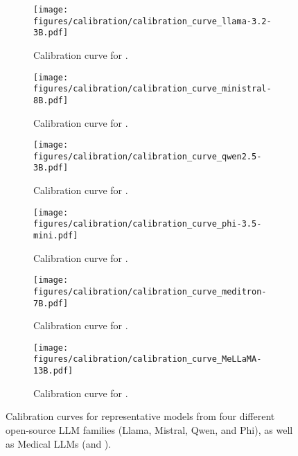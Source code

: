 \begin{figure}[h]
    \centering
    \begin{subfigure}{0.233\textwidth}
        \centering
        \texttt{[image: figures/calibration/calibration\_curve\_llama-3.2-3B.pdf]}
        \caption{Calibration curve for \llamad.}
    \end{subfigure}
    \hfill
    \begin{subfigure}{0.233\textwidth}
        \centering
        \texttt{[image: figures/calibration/calibration\_curve\_ministral-8B.pdf]}
        \caption{Calibration curve for \ministral.}
    \end{subfigure}
    
    \vspace{0.5cm}
    
    \begin{subfigure}{0.233\textwidth}
        \centering
        \texttt{[image: figures/calibration/calibration\_curve\_qwen2.5-3B.pdf]}
        \caption{Calibration curve for \qwenc.}
    \end{subfigure}
    \hfill
    \begin{subfigure}{0.233\textwidth}
        \centering
        \texttt{[image: figures/calibration/calibration\_curve\_phi-3.5-mini.pdf]}
        \caption{Calibration curve for \phic.}
    \end{subfigure}
    
    \vspace{0.5cm}
    
    \begin{subfigure}{0.233\textwidth}
        \centering
        \texttt{[image: figures/calibration/calibration\_curve\_meditron-7B.pdf]}
        \caption{Calibration curve for \meditron.}
    \end{subfigure}
    \hfill
    \begin{subfigure}{0.233\textwidth}
        \centering
        \texttt{[image: figures/calibration/calibration\_curve\_MeLLaMA-13B.pdf]}
        \caption{Calibration curve for \mellama.}
    \end{subfigure}
    
    \caption{Calibration curves for representative models from four different open-source LLM families (Llama, Mistral, Qwen, and Phi), as well as Medical LLMs (\meditron and \mellama).}
    \label{fig:calibration_curves}
    \vspace{-1.2em}
\end{figure}

